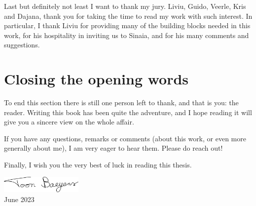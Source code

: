 Last but definitely not least I want to thank my jury. Liviu, Guido, Veerle, Kris and Dajana, thank you for taking the time to read my work with such interest. In particular, I thank Liviu for providing many of the building blocks needed in this work, for his hospitality in inviting us to Sinaia, and for his many comments and suggestions.

\section*{Closing the opening words}

To end this section there is still one person left to thank, and that is you: the reader. Writing this book has been quite the adventure, and I hope reading it will give you a sincere view on the whole affair.


If you have any questions, remarks or comments (about this work, or even more generally about me), I am very eager to hear them. Please do reach out!

Finally, I wish you the very best of luck in reading this thesis.


\begin{flushright}
    \includegraphics[width=4cm]{img/signature.pdf}\\
    June 2023
\end{flushright}

\stopchapter


